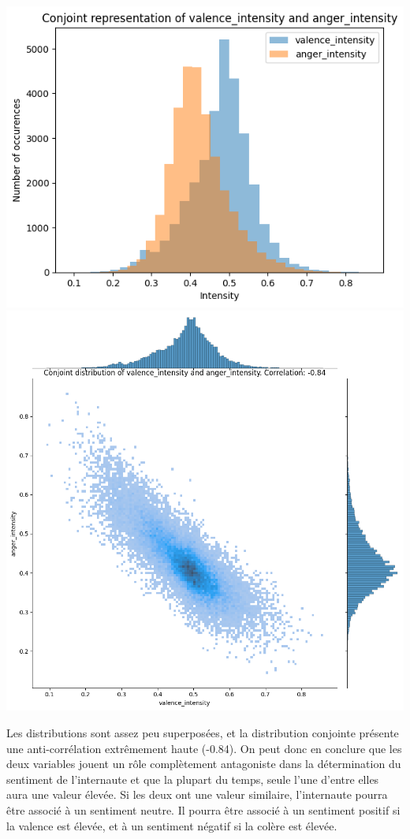 \documentclass{article}
\begin{document}
\begin{center}
    \includegraphics[scale=0.39]{./img/conjoint_representation_valence_intensity_anger_intensity.png}
    \includegraphics[scale=0.23]{./img/conjoint_distribution_valence_intensity_anger_intensity.png}
\end{center}

Les distributions sont assez peu superposées, et la distribution conjointe présente une
anti-corrélation extrêmement haute (-0.84). On peut donc en conclure que les deux variables jouent
un rôle complètement antagoniste dans la détermination du sentiment de l'internaute et que
la plupart du temps, seule l'une d'entre elles aura une valeur élevée. Si les deux ont une
valeur similaire, l'internaute pourra être associé à un sentiment neutre.
Il pourra être associé à un sentiment positif si la valence est élevée, et 
à un sentiment négatif si la colère est élevée.
\end{document}
